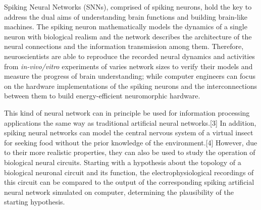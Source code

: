 
Spiking Neural Networks (SNNs), comprised of spiking neurons, hold the key to address the dual aims of understanding brain functions and building brain-like machines.
The spiking neuron mathematically models the dynamics of a single neuron with biological realism and the network describes the architecture of the neural connections and the information transmission among them.
Therefore, neuroscientists are able to reproduce the recorded neural dynamics and activities from \textit{in-vivo/vitro} experiments of varies network sizes to verify their models and measure the progress of brain understanding;
while computer engineers can focus on the hardware implementations of the spiking neurons and the interconnections between them to build energy-efficient neuromorphic hardware.





This kind of neural network can in principle be used for information processing applications the same way as traditional artificial neural networks.[3] In addition, spiking neural networks can model the central nervous system of a virtual insect for seeking food without the prior knowledge of the environment.[4] However, due to their more realistic properties, they can also be used to study the operation of biological neural circuits. Starting with a hypothesis about the topology of a biological neuronal circuit and its function, the electrophysiological recordings of this circuit can be compared to the output of the corresponding spiking artificial neural network simulated on computer, determining the plausibility of the starting hypothesis.

